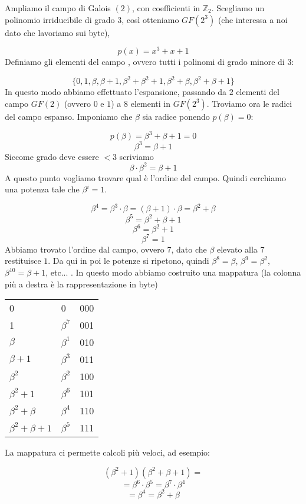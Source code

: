 \documentclass[12pt]{report}
\begin{document}
    \begin{exmp}
        Ampliamo il campo di Galois $(2)$, con coefficienti in $\mathbb{Z}_2$. Scegliamo un polinomio irriducibile di grado $3$, così otteniamo $GF(2^3)$ (che interessa a noi dato che lavoriamo sui byte),

        $$p(x) = x^3 + x + 1$$
        Definiamo gli elementi del campo , ovvero tutti i polinomi di grado minore di $3$:

        $$\{0,1,\beta, \beta + 1, \beta^2 + \beta^2 + 1, \beta^2 + \beta, \beta^2 + \beta + 1\}$$
        In questo modo abbiamo effettuato l'espansione, passando da $2$ elementi del campo $GF(2)$ (ovvero $0$ e $1$) a $8$ elementi in $GF(2^3)$. Troviamo ora le radici del campo espanso. Imponiamo che $\beta$ sia radice ponendo $p(\beta) = 0$:

        $$p(\beta) = \beta^3 + \beta + 1 = 0$$
        $$\beta^3 = \beta + 1$$
        Siccome grado deve essere $<3$ scriviamo
        $$\beta \cdot \beta^2 = \beta + 1$$
        A questo punto vogliamo trovare qual è l'ordine del campo. Quindi cerchiamo una potenza tale che $\beta^i = 1$.

        $$\beta^4 = \beta^3 \cdot \beta = (\beta + 1) \cdot \beta = \beta^2 + \beta $$
        $$\beta^5 = \beta^2 + \beta + 1$$
        $$\beta^6 = \beta^2 + 1$$
        $$\beta^7 = 1$$
        Abbiamo trovato l'ordine dal campo, ovvero $7$, dato che $\beta$ elevato alla $7$ restituisce $1$.
        Da qui in poi le potenze si ripetono, quindi $\beta^8 = \beta$, $\beta^9 = \beta^2$, $\beta^{10} = \beta + 1$, etc... . In questo modo abbiamo costruito una mappatura (la colonna più a destra è la rappresentazione in byte)

        \begin{center}

            \begin{tabular}{l|l|l}

                0  & 0 & 000 \\
                1  & $\beta^7$ & 001 \\
                $\beta$ & $\beta^1$ & 010 \\
                $\beta + 1$ & $\beta^3$ & 011 \\
                $\beta^2$ & $\beta^2$ & 100 \\
                $\beta^2 + 1$ & $\beta^6$ & 101 \\
                $\beta^2 + \beta$ & $\beta^4$ & 110 \\
                $\beta^2 + \beta + 1$ & $\beta^5$ & 111
            \end{tabular}
        \end{center}

        \noindent
        La mappatura ci permette calcoli più veloci, ad esempio:

        $$(\beta^2 + 1) (\beta^2 + \beta + 1) = $$
        $$= \beta^6 \cdot \beta^5 = \beta^7 \cdot \beta^4$$
        $$= \beta^4 = \beta^2 + \beta$$
    \end{exmp}
\end{document}
